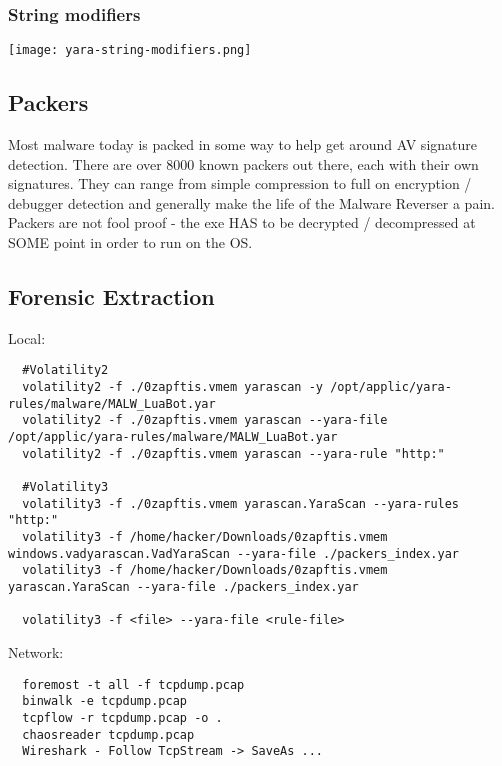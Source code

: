 \subsubsection{String modifiers}
\texttt{[image: yara-string-modifiers.png]}

\subsection{Packers}
Most malware today is packed in some way to help get around AV signature detection.
There are over 8000 known packers out there, each with their own signatures.
They can range from simple compression to full on encryption / debugger detection and generally make the life of the Malware Reverser a pain.
Packers are not fool proof - the exe HAS to be decrypted / decompressed at SOME point in order to run on the OS.


\subsection{Forensic Extraction}
Local:
\begin{lstlisting}
  #Volatility2
  volatility2 -f ./0zapftis.vmem yarascan -y /opt/applic/yara-rules/malware/MALW_LuaBot.yar
  volatility2 -f ./0zapftis.vmem yarascan --yara-file /opt/applic/yara-rules/malware/MALW_LuaBot.yar
  volatility2 -f ./0zapftis.vmem yarascan --yara-rule "http:"
  
  #Volatility3
  volatility3 -f ./0zapftis.vmem yarascan.YaraScan --yara-rules "http:"
  volatility3 -f /home/hacker/Downloads/0zapftis.vmem windows.vadyarascan.VadYaraScan --yara-file ./packers_index.yar
  volatility3 -f /home/hacker/Downloads/0zapftis.vmem yarascan.YaraScan --yara-file ./packers_index.yar

  volatility3 -f <file> --yara-file <rule-file>
  \end{lstlisting}

  Network:
  \begin{lstlisting}
  foremost -t all -f tcpdump.pcap
  binwalk -e tcpdump.pcap
  tcpflow -r tcpdump.pcap -o .
  chaosreader tcpdump.pcap
  Wireshark - Follow TcpStream -> SaveAs ...
  \end{lstlisting}
  